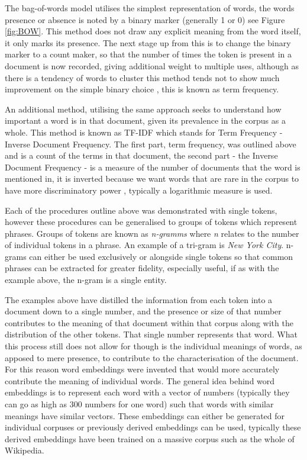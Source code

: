The bag-of-words model utilises the simplest representation of words, the words presence or absence is noted by a binary marker (generally 1 or 0) see Figure \ref{fig:BOW}. This method does not draw any explicit meaning from the word itself, it only marks its presence. The next stage up from this is to change the binary marker to a count maker, so that the number of times the token is present in a document is now recorded, giving additional weight to multiple uses, although as there is a tendency of words to cluster this method tends not to show much improvement on the simple binary choice \parencite{eisenstein2018natural}, this is known as term frequency. 

An additional method, utilising the same approach seeks to understand how important a word is in that document, given its prevalence in the corpus as a whole. This method is known as TF-IDF which stands for Term Frequency - Inverse Document Frequency.  The first part, term frequency, was outlined above and is a count of the terms in that document, the second part - the Inverse Document Frequency - is a measure of the number of documents that the word is mentioned in, it is inverted because we want words that are rare in the corpus to have more discriminatory power \parencite{manning2008introduction}, typically a logarithmic measure is used. 

Each of the procedures outline above was demonstrated with single tokens, however these procedures can be generalised to groups of tokens which represent phrases. Groups of tokens are known as \emph{n-gramms} where  \emph{n} relates to the number of individual tokens in a phrase. An example of a tri-gram is \emph{New York City}. n-grams can either be used exclusively or alongside single tokens so that common phrases can be extracted for greater fidelity, especially useful, if as with the example above, the n-gram is a single entity. 

The examples above have distilled the information from each token into a document down to a single number, and the presence or size of that number contributes to the meaning of that document within that corpus along with the distribution of the other tokens. That single number represents that word. What this process still does not allow for though is the individual meanings of words, as apposed to mere presence, to contribute to the characterisation of the document. For this reason word embeddings were invented that would more accurately contribute the meaning of individual words. The general idea behind word embeddings is to represent each word with a vector of numbers (typically they can go as high as 300 numbers for one word) such that words with similar meanings have similar vectors. These embeddings can either be generated for individual corpuses or previously derived embeddings can be used, typically these derived embeddings have been trained on a massive corpus such as the whole of Wikipedia. 


